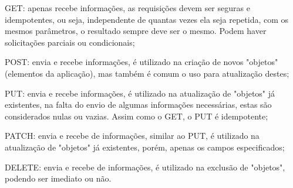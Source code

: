         \begin{alineascomponto}
        	\item GET: apenas recebe informações, as requisições devem ser seguras e idempotentes, ou seja, independente de quantas vezes ela seja repetida, com os mesmos parâmetros, o resultado sempre deve ser o mesmo. Podem haver solicitações parciais ou condicionais;

            \item POST: envia e recebe informações, é utilizado na criação de novos "objetos"\: (elementos da aplicação), mas também é comum o uso para atualização destes;
            
            \item PUT: envia e recebe informações, é utilizado na atualização de "objetos"\: já existentes, na falta do envio de algumas informações necessárias, estas são considerados nulas ou vazias. Assim como o GET, o PUT é idempotente;
            
            \item PATCH: envia e recebe de informações, similar ao PUT,  é utilizado na atualização de "objetos"\: já existentes, porém, apenas os campos especificados;

            \item DELETE: envia e recebe de informações, é utilizado na exclusão de "objetos", podendo ser imediato ou não.
        \end{alineascomponto}
        
       
        
        \begin{table}[h!]	
        	\centering
        \end{table}


